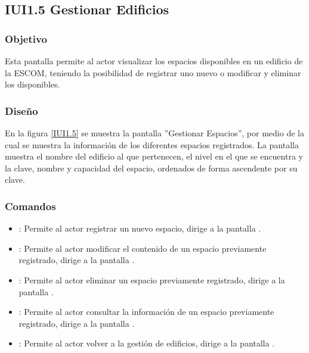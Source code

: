 \subsection{IUI1.5 Gestionar Edificios}

\subsubsection{Objetivo}
	
Esta pantalla permite al actor visualizar los espacios disponibles en un edificio de la ESCOM, teniendo la posibilidad de registrar uno nuevo o modificar y eliminar los disponibles.

\subsubsection{Diseño}

    En la figura \ref{IUI1.5} se muestra la pantalla ''Gestionar Espacios'', por medio de la cual se muestra la información de los diferentes espacios registrados. La pantalla muestra el nombre del edificio al que pertenecen, el nivel en el que se encuentra y la clave, nombre y capacidad del espacio, ordenados de forma ascendente por su clave.
 

\subsubsection{Comandos}
    \begin{itemize}
	\item \btnRegistrar: Permite al actor registrar un nuevo espacio, dirige a la pantalla .
	
	\item {}: Permite al actor modificar el contenido de un espacio previamente registrado, dirige a la pantalla .
	
	\item {}: Permite al actor eliminar un espacio previamente registrado, dirige a la pantalla .

	\item {}: Permite al actor consultar la información de un espacio previamente registrado, dirige a la pantalla .

	\item {}: Permite al actor volver a la gestión de edificios, dirige a la pantalla .

	
    \end{itemize}
